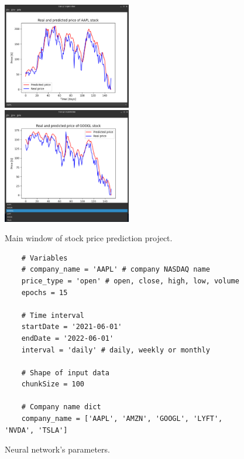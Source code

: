  
\begin{figure}
\centering
\includegraphics[width=0.5\textwidth]{./graf/MainWindow.png}
\includegraphics[width=0.5\textwidth]{./graf/MainWindow_select.png}
\caption{Main window of stock price prediction project.}
\label{fig:label}
\end{figure}

\clearpage
\begin{figure}
\centering
\begin{lstlisting}
    # Variables
    # company_name = 'AAPL' # company NASDAQ name
    price_type = 'open' # open, close, high, low, volume
    epochs = 15

    # Time interval
    startDate = '2021-06-01'
    endDate = '2022-06-01'
    interval = 'daily' # daily, weekly or monthly

    # Shape of input data
    chunkSize = 100

    # Company name dict
    company_name = ['AAPL', 'AMZN', 'GOOGL', 'LYFT', 'NVDA', 'TSLA']
\end{lstlisting}
\caption{Neural network's parameters.}
\label{fig:pseudocode:listings}
\end{figure}

